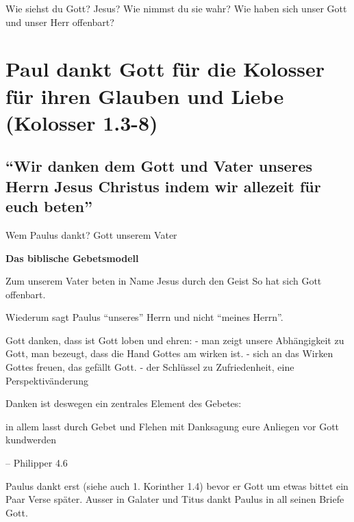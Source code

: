 \documentclass[
  12pt,
]{krantz}
\makeatletter
\newenvironment{kframe}{%
\medskip{}
\setlength{\fboxsep}{.8em}
 \def\at@end@of@kframe{}%
 \ifinner\ifhmode%
  \def\at@end@of@kframe{\end{minipage}}%
  \begin{minipage}{\columnwidth}%
 \fi\fi%
 \def\FrameCommand##1{\hskip\@totalleftmargin \hskip-\fboxsep
 \colorbox{shadecolor}{##1}\hskip-\fboxsep
     \hskip-\linewidth \hskip-\@totalleftmargin \hskip\columnwidth}%
 \MakeFramed {\advance\hsize-\width
   \@totalleftmargin\z@ \linewidth\hsize
   \@setminipage}}%
 {\par\unskip\endMakeFramed%
 \at@end@of@kframe}
\newenvironment{rmdblock}[1]
  {
  \begin{itemize}
  \renewcommand{\labelitemi}{
    \raisebox{-.7\height}[0pt][0pt]{
      {\setkeys{Gin}{width=3em,keepaspectratio}\texttt{[image: img/\#1]}}
    }
  }
  \setlength{\fboxsep}{1em}
  \begin{kframe}
  \item
  }
  {
  \end{kframe}
  \end{itemize}
  }
\newenvironment{rmdquestion}
  {\begin{rmdblock}{question}}
  {\end{rmdblock}}
\newenvironment{rmdquote}
  {\begin{rmdblock}{quote}}
  {\end{rmdblock}}
\newenvironment{rmddefinition}
  {\begin{rmdblock}{definition}}
  {\end{rmdblock}}
\makeatother
\begin{document}
\begin{rmdquestion}
Wie siehst du Gott? Jesus? Wie nimmst du sie wahr? Wie haben sich unser
Gott und unser Herr offenbart?
\end{rmdquestion}

\hypertarget{paul-dankt-gott-fuxfcr-die-kolosser-fuxfcr-ihren-glauben-und-liebe-kolosser-1.3-8}{%
\section{Paul dankt Gott für die Kolosser für ihren Glauben und Liebe (Kolosser 1.3-8)}\label{paul-dankt-gott-fuxfcr-die-kolosser-fuxfcr-ihren-glauben-und-liebe-kolosser-1.3-8}}

\hypertarget{wir-danken-dem-gott-und-vater-unseres-herrn-jesus-christus-indem-wir-allezeit-fuxfcr-euch-beten}{%
\subsection{``Wir danken dem Gott und Vater unseres Herrn Jesus Christus indem wir allezeit für euch beten''}\label{wir-danken-dem-gott-und-vater-unseres-herrn-jesus-christus-indem-wir-allezeit-fuxfcr-euch-beten}}

Wem Paulus dankt? Gott unserem Vater

\begin{rmddefinition}
\textbf{Das biblische Gebetsmodell}

Zum unserem Vater beten in Name Jesus durch den Geist So hat sich Gott
offenbart.
\end{rmddefinition}

Wiederum sagt Paulus ``unseres'' Herrn und nicht ``meines Herrn''.

Gott danken, dass ist Gott loben und ehren:
- man zeigt unsere Abhängigkeit zu Gott, man bezeugt, dass die Hand Gottes am wirken ist.
- sich an das Wirken Gottes freuen, das gefällt Gott.
- der Schlüssel zu Zufriedenheit, eine Perspektivänderung

Danken ist deswegen ein zentrales Element des Gebetes:

\begin{rmdquote}
in allem lasst durch Gebet und Flehen mit Danksagung eure Anliegen vor
Gott kundwerden

-- Philipper 4.6
\end{rmdquote}

Paulus dankt erst (siehe auch 1. Korinther 1.4) bevor er Gott um etwas bittet ein Paar Verse später. Ausser in Galater und Titus dankt Paulus in all seinen Briefe Gott.
\end{document}
